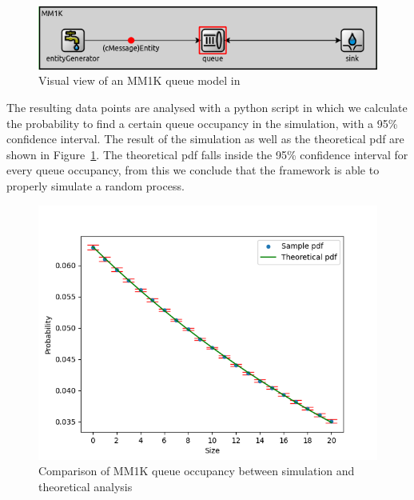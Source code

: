 \begin{figure}[htbp]
    \centering
    \includegraphics[width=\textwidth]{images/MM1K_sim.png}
    \caption{Visual view of an MM1K queue model in \omnet}
    \label{fig:mm1k_sim}
\end{figure}

The resulting data points are analysed with a python script in which we calculate the probability to find a certain queue occupancy in the simulation, with a 95\% confidence interval. The result of the simulation as well as the theoretical pdf are shown in Figure~\ref{fig:mm1k_sim}. The theoretical pdf falls inside the 95\% confidence interval for every queue occupancy, from this we conclude that the framework is able to properly simulate a random process.

\begin{figure}[htbp]
    \centering
    \includegraphics[width=\textwidth]{images/MM1k_analysis.png}
    \caption{Comparison of MM1K queue occupancy between simulation and theoretical analysis}
    \label{fig:MM1K_analysis}
\end{figure}

